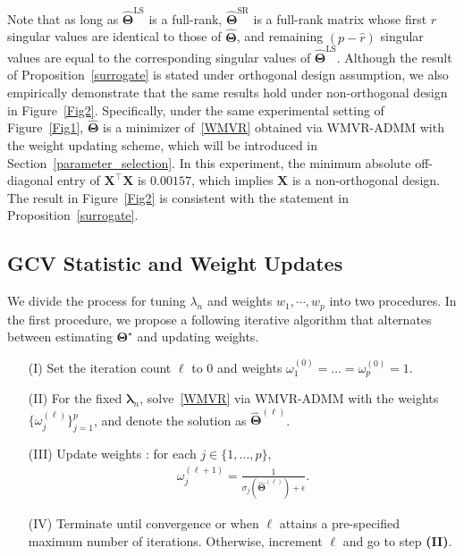 \documentclass[alpha-refs]{wiley-article}
\begin{document}
Note that as long as $\widehat{\boldsymbol{\Theta}}^{\text{LS}}$ is a full-rank, $\widehat{\boldsymbol{\Theta}}^{\text{SR}}$ is a full-rank matrix whose first $\widehat{r}$ singular values are identical to those of $\widehat{\boldsymbol{\Theta}}$, and remaining $(p-\widehat{r})$ singular values are equal to the  corresponding singular values of $\widehat{\boldsymbol{\Theta}}^{\text{LS}}$.
Although the result of Proposition~\ref{surrogate} is stated under orthogonal design assumption, we also empirically demonstrate that the same results hold under non-orthogonal design in Figure~\ref{Fig2}.
Specifically, under the same experimental setting of Figure~\ref{Fig1}, $\widehat{\boldsymbol{\Theta}}$ is a minimizer of~\eqref{WMVR} obtained via WMVR-ADMM with the weight updating scheme, which will be introduced in Section~\ref{parameter_selection}.
In this experiment, the minimum absolute off-diagonal entry of $\boldsymbol{X}^{\top}\boldsymbol{X}$ is $0.00157$, which implies $\boldsymbol{X}$ is a non-orthogonal design.
The result in Figure~\ref{Fig2} is consistent with the statement in Proposition~\ref{surrogate}.

\subsection{GCV Statistic and Weight Updates}
We divide the process for tuning $\lambda_{n}$ and weights $w_{1}, \cdots, w_{p}$ into two procedures.
In the first procedure, we propose a following iterative algorithm that alternates between estimating $\boldsymbol{\Theta}^{\star}$ and updating weights.
\begin{enumerate}
    \item[(I)] Set the iteration count $\ell$ to $0$ and weights $\omega_{1}^{(0)}=\dots=\omega_{p}^{(0)}=1$.
    \item[(II)] For the fixed $\boldsymbol{\lambda}_{n}$, solve~\eqref{WMVR} via WMVR-ADMM with the weights $\{\omega_{j}^{(\ell)}\}_{j=1}^{p}$, and denote the solution as  $\widehat{\boldsymbol{\Theta}}^{(\ell)}$.
    \item[(III)] Update weights : for each $j\in\{1,\dots,p\}$,
    \begin{align} \label{weight}
        \omega_{j}^{(\ell+1)}=\frac{1}{\sigma_{j}(\widehat{\boldsymbol{\Theta}}^{(\ell)})+\epsilon}.
    \end{align}
    \item[(IV)] Terminate until convergence or when $\ell$ attains a pre-specified maximum number of iterations.
    Otherwise, increment $\ell$ and go to step {\bf(II)}.
\end{enumerate}
\end{document}
